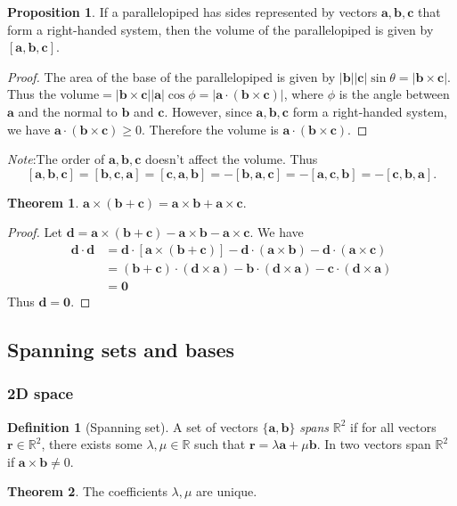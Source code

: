 \documentclass[a4paper]{article}
\theoremstyle{definition}
\newtheorem*{prop}{Proposition}
\newtheorem*{thm}{Theorem}
\newtheorem*{defi}{Definition}
\newcommand{\mb}[1]{\mathbf{#1}}
\newcommand{\note}{\noindent \emph{Note}:\;}
\newcommand{\R}{\mathbb{R}}
\begin{document}
\begin{prop}
  If a parallelopiped has sides represented by vectors $\mb{a, b, c}$ that form a right-handed system, then the volume of the parallelopiped is given by $\mb{[a, b, c]}$.
\end{prop}

\begin{proof}
  The area of the base of the parallelopiped is given by $\mb{|b||c|}\sin\theta = \mb{|b\times c|}$. Thus the volume$ = \mb{|b\times c||a|}\cos\phi = \mb{|a\cdot(b\times c)|}$, where $\phi$ is the angle between $\mb{a}$ and the normal to $\mb{b}$ and $\mb{c}$. However, since $\mb{a, b, c}$ form a right-handed system, we have $\mb{a\cdot (b\times c)} \geq 0$. Therefore the volume is $\mb{a\cdot(b\times c)}$.
\end{proof}
\note The order of $\mb{a, b, c}$ doesn't affect the volume. Thus
\[
\mb{[a, b, c] = [b, c, a] = [c, a, b] = -[b, a, c] = -[a, c, b] = -[c, b, a]}.
\]

\begin{thm}
  $\mb{a\times (b + c) = a\times b + a\times c}$.
\end{thm}
\begin{proof}
  Let $\mb{d = a\times (b + c) - a\times b - a\times c}$. We have
  \begin{align*}
    \mb{d\cdot d} &= \mb{d\cdot[a\times (b + c)] - d\cdot(a\times b) - d\cdot(a\times c)}\\
    &= \mb{(b+c)\cdot(d \times a) - b\cdot(d\times a) - c\cdot(d\times a)}\\
    &= \mb{0}
  \end{align*}
  Thus $\mb{d = 0}$.
\end{proof}

\subsection{Spanning sets and bases}
\subsubsection{2D space}
\begin{defi}[Spanning set]
  A set of vectors $\{\mb{a, b}\}$ \emph{spans} $\R^2$ if for all vectors $\mb{r}\in \R^2$, there exists some $\lambda, \mu\in \R$ such that $\mb{r} = \lambda\mb{a} + \mu\mb{b}$. In two vectors span $\R^2$  if $\mb{a\times b}\not= 0$.
\end{defi}
\begin{thm}
  The coefficients $\lambda, \mu$ are unique.
\end{thm}
\end{document}
